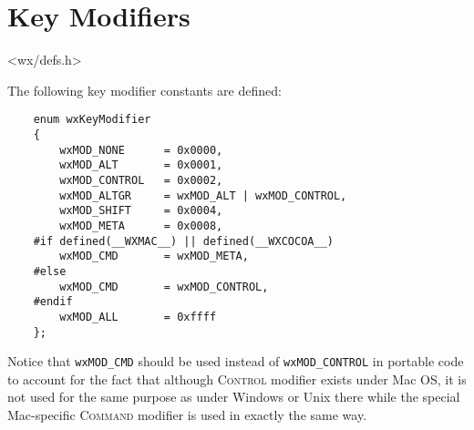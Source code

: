 \section{Key Modifiers}\label{keymodifiers}


<wx/defs.h>

The following key modifier constants are defined:

{\small
\begin{verbatim}
    enum wxKeyModifier
    {
        wxMOD_NONE      = 0x0000,
        wxMOD_ALT       = 0x0001,
        wxMOD_CONTROL   = 0x0002,
        wxMOD_ALTGR     = wxMOD_ALT | wxMOD_CONTROL,
        wxMOD_SHIFT     = 0x0004,
        wxMOD_META      = 0x0008,
    #if defined(__WXMAC__) || defined(__WXCOCOA__)
        wxMOD_CMD       = wxMOD_META,
    #else
        wxMOD_CMD       = wxMOD_CONTROL,
    #endif
        wxMOD_ALL       = 0xffff
    };
\end{verbatim}
}

Notice that \texttt{wxMOD\_CMD} should be used instead of 
\texttt{wxMOD\_CONTROL} in portable code to account for the fact that although 
\textsc{Control} modifier exists under Mac OS, it is not used for the same
purpose as under Windows or Unix there while the special Mac-specific 
\textsc{Command} modifier is used in exactly the same way.

